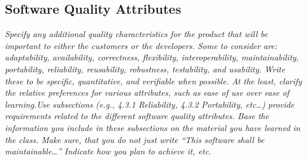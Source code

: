     \subsection{Software Quality Attributes}\label{sec:quality-attributes}
        \emph{Specify any additional quality characteristics for the product that will be important to either the customers or the developers. Some to consider are: adaptability, availability, correctness, flexibility, interoperability, maintainability, portability, reliability, reusability, robustness, testability, and usability. Write these to be specific, quantitative, and verifiable when possible. At the least, clarify the relative preferences for various attributes, such as ease of use over ease of learning.\gnl Use subsections (e.g., 4.3.1 Reliability, 4.3.2 Portability, etc\dots) provide requirements related to the different software quality attributes. Base the information you include in these subsections on the material you have learned in the class. Make sure, that you do not just write “This software shall be maintainable…” Indicate how you plan to achieve it, etc.}
